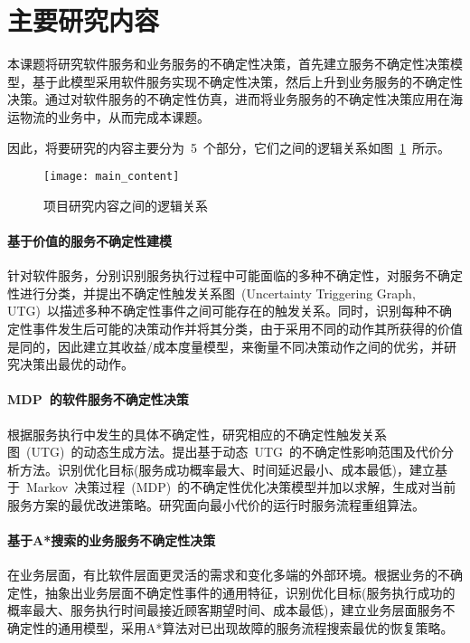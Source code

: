 \section{主要研究内容}

本课题将研究软件服务和业务服务的不确定性决策，首先建立服务不确定性决策模型，基于此模型采用软件服务实现不确定性决策，然后上升到业务服务的不确定性决策。通过对软件服务的不确定性仿真，进而将业务服务的不确定性决策应用在海运物流的业务中，从而完成本课题。

因此，将要研究的内容主要分为~5~个部分，它们之间的逻辑关系如图~\ref{main_content}~所示。

\begin{figure}[htbp]
    \centering
    \texttt{[image: main\_content]}
    \caption{项目研究内容之间的逻辑关系}\label{main_content}
    \vspace{-1em}
\end{figure}

\setcounter{paragraph}{0}

\paragraph{基于价值的服务不确定性建模}

针对软件服务，分别识别服务执行过程中可能面临的多种不确定性，对服务不确定性进行分类，并提出不确定性触发关系图~(Uncertainty Triggering Graph, UTG)~以描述多种不确定性事件之间可能存在的触发关系。同时，识别每种不确定性事件发生后可能的决策动作并将其分类，由于采用不同的动作其所获得的价值是同的，因此建立其收益/成本度量模型，来衡量不同决策动作之间的优劣，并研究决策出最优的动作。

\paragraph{MDP~的软件服务不确定性决策}

根据服务执行中发生的具体不确定性，研究相应的不确定性触发关系图~(UTG)~的动态生成方法。提出基于动态~UTG~的不确定性影响范围及代价分析方法。识别优化目标(服务成功概率最大、时间延迟最小、成本最低)，建立基于~Markov~决策过程~(MDP)~的不确定性优化决策模型并加以求解，生成对当前服务方案的最优改进策略。研究面向最小代价的运行时服务流程重组算法。

\paragraph{基于A*搜索的业务服务不确定性决策}
在业务层面，有比软件层面更灵活的需求和变化多端的外部环境。根据业务的不确定性，抽象出业务层面不确定性事件的通用特征，识别优化目标(服务执行成功的概率最大、服务执行时间最接近顾客期望时间、成本最低)，建立业务层面服务不确定性的通用模型，采用A*算法对已出现故障的服务流程搜索最优的恢复策略。

